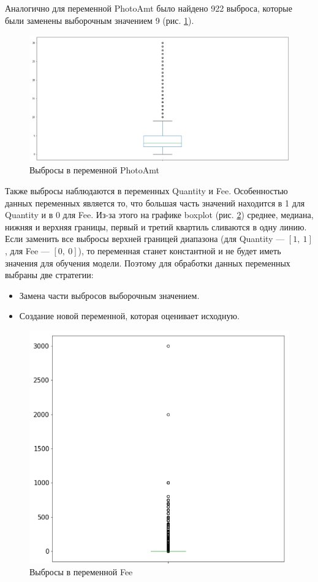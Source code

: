 \documentclass[14pt]{mmcs_article}
\begin{document}
Аналогично для переменной PhotoAmt было найдено 922 выброса, которые были заменены выборочным значением 9 (рис. \ref{analyse:photooutlier}).

\begin{figure}[H]
	\centering
	\includegraphics[scale=0.7]{photooutlier.png}
	\caption{Выбросы в переменной PhotoAmt}\label{analyse:photooutlier}
\end{figure}

Также выбросы наблюдаются в переменных Quantity и Fee. Особенностью данных переменных является то, что большая часть значений находится в 1 для Quantity и в 0 для Fee. Из-за этого на графике boxplot (рис. \ref{analyse:feeoutlier}) среднее, медиана, нижняя и верхняя границы, первый и третий квартиль сливаются в одну линию. Если заменить все выбросы верхней границей диапазона (для Quantity --- $[1,\ 1]$, для Fee --- $[0,\ 0]$), то переменная станет константной и не будет иметь значения для обучения модели. Поэтому для обработки данных переменных выбраны две стратегии:
\begin{itemize}
	\item Замена части выбросов выборочным значением.
	\item Создание новой переменной, которая оценивает исходную.
\end{itemize}

\begin{figure}[H]
	\centering
	\includegraphics[scale=0.7]{feeoutlier.png}
	\caption{Выбросы в переменной Fee}\label{analyse:feeoutlier}
\end{figure}
\end{document}
